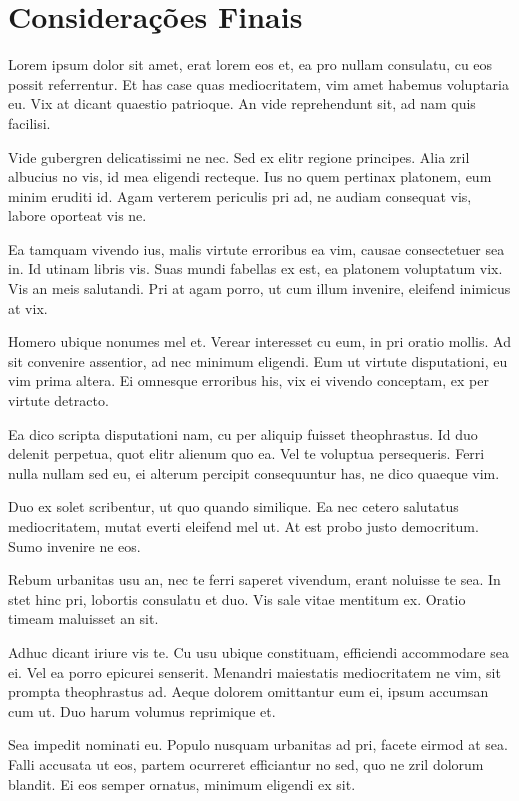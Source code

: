 \chapter{Considerações Finais}
\label{chap:consideracoes-finais}

	Lorem ipsum dolor sit amet, erat lorem eos et, ea pro nullam consulatu, cu eos possit referrentur. Et has case quas mediocritatem, vim amet habemus voluptaria eu. Vix at dicant quaestio patrioque. An vide reprehendunt sit, ad nam quis facilisi.

	Vide gubergren delicatissimi ne nec. Sed ex elitr regione principes. Alia zril albucius no vis, id mea eligendi recteque. Ius no quem pertinax platonem, eum minim eruditi id. Agam verterem periculis pri ad, ne audiam consequat vis, labore oporteat vis ne.

	Ea tamquam vivendo ius, malis virtute erroribus ea vim, causae consectetuer sea in. Id utinam libris vis. Suas mundi fabellas ex est, ea platonem voluptatum vix. Vis an meis salutandi. Pri at agam porro, ut cum illum invenire, eleifend inimicus at vix.

	Homero ubique nonumes mel et. Verear interesset cu eum, in pri oratio mollis. Ad sit convenire assentior, ad nec minimum eligendi. Eum ut virtute disputationi, eu vim prima altera. Ei omnesque erroribus his, vix ei vivendo conceptam, ex per virtute detracto.

	Ea dico scripta disputationi nam, cu per aliquip fuisset theophrastus. Id duo delenit perpetua, quot elitr alienum quo ea. Vel te voluptua persequeris. Ferri nulla nullam sed eu, ei alterum percipit consequuntur has, ne dico quaeque vim.

	Duo ex solet scribentur, ut quo quando similique. Ea nec cetero salutatus mediocritatem, mutat everti eleifend mel ut. At est probo justo democritum. Sumo invenire ne eos.

	Rebum urbanitas usu an, nec te ferri saperet vivendum, erant noluisse te sea. In stet hinc pri, lobortis consulatu et duo. Vis sale vitae mentitum ex. Oratio timeam maluisset an sit.

	Adhuc dicant iriure vis te. Cu usu ubique constituam, efficiendi accommodare sea ei. Vel ea porro epicurei senserit. Menandri maiestatis mediocritatem ne vim, sit prompta theophrastus ad. Aeque dolorem omittantur eum ei, ipsum accumsan cum ut. Duo harum volumus reprimique et.

	Sea impedit nominati eu. Populo nusquam urbanitas ad pri, facete eirmod at sea. Falli accusata ut eos, partem ocurreret efficiantur no sed, quo ne zril dolorum blandit. Ei eos semper ornatus, minimum eligendi ex sit.

